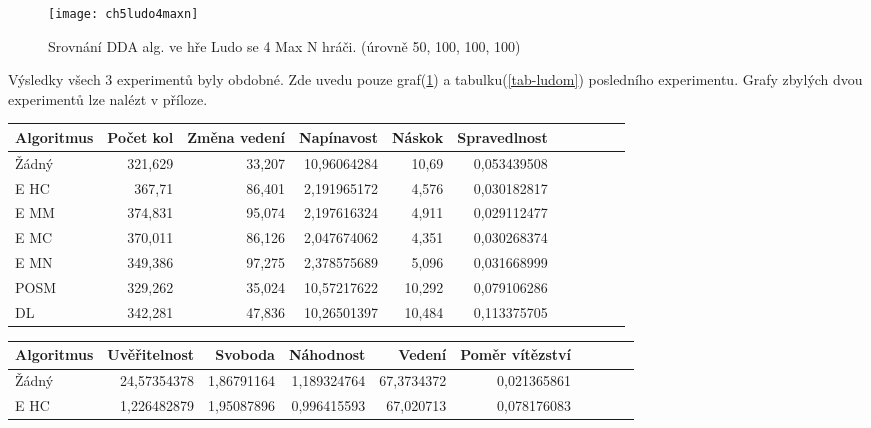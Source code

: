 \begin{figure}
  \centering
  \texttt{[image: ch5ludo4maxn]}
	\caption{Srovnání DDA alg. ve hře Ludo se 4 Max N hráči. (úrovně 50, 100, 100, 100)}
	\label{fig-ch5ludo4maxn}
\end{figure}

Výsledky všech 3 experimentů byly obdobné. Zde uvedu pouze graf(\ref{fig-ch5ludo4maxn}) a tabulku(\ref{tab-ludom}) posledního experimentu. Grafy zbylých dvou experimentů lze nalézt v příloze.

\begin{table*}[b]\footnotesize
\vspace*{0mm}
\caption{{\label{tab-ludom}} Porovnání metrik zábavnosti u jednotlivých algoritmů ve hře Ludo. Metriky změna vedení a svoboda se maximalizují, zbytek minimalizuje.}
\vspace*{0mm}
\label{shadowtable}
\begin{center}
\begin{tabular}{| l || r | r | r | r | r | r | r | r | r | r |}
\hline
Algoritmus & Počet kol	& Změna vedení & Napínavost & Náskok & Spravedlnost\\
\hline
\hline
Žádný & 321,629 & 33,207 & 10,96064284 & 10,69 & 0,053439508 \\ \hline  
E HC & 367,71 & 86,401 & 2,191965172 & 4,576 & 0,030182817 \\ \hline  
E MM & 374,831 & 95,074 & 2,197616324 & 4,911 & 0,029112477 \\ \hline  
E MC & 370,011 & 86,126 & 2,047674062 & 4,351 & 0,030268374 \\ \hline  
E MN & 349,386 & 97,275 & 2,378575689 & 5,096 & 0,031668999 \\ \hline  
POSM & 329,262 & 35,024 & 10,57217622 & 10,292 & 0,079106286 \\ \hline  
DL & 342,281 & 47,836 & 10,26501397 & 10,484 & 0,113375705 \\ \hline  
\end{tabular}
\end{center}
\begin{center}
\begin{tabular}{| l || r | r | r | r | r | r | r | r | r |}
\hline
Algoritmus & Uvěřitelnost & Svoboda & Náhodnost & Vedení &	Poměr vítězství \\
\hline
\hline
Žádný & 24,57354378 & 1,86791164 & 1,189324764 & 67,3734372 & 0,021365861 \\ \hline  
E HC & 1,226482879 & 1,95087896 & 0,996415593 & 67,020713 & 0,078176083 \\ \hline  

\end{tabular}
\end{center}
\end{table*}
